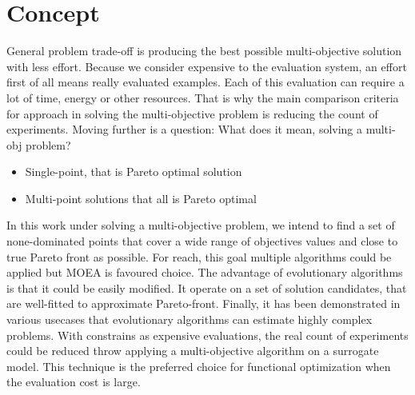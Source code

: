 \chapter{Concept}

    General problem trade-off is producing the best possible multi-objective solution with less effort. Because we consider expensive to the evaluation system, an effort first of all means really evaluated examples. Each of this evaluation can require a lot of time, energy or other resources. That is why the main comparison criteria for approach in solving the multi-objective problem is reducing the count of experiments. Moving further is a question: What does it mean, solving a multi-obj problem?
    \begin{itemize}
        \item Single-point, that is Pareto optimal solution
        \item Multi-point solutions that all is Pareto optimal
    \end{itemize}

    In this work under solving a multi-objective problem, we intend to find a set of none-dominated points that cover a wide range of objectives values and close to true Pareto front as possible. For reach, this goal multiple algorithms could be applied but MOEA is favoured choice. The advantage of evolutionary algorithms is that it could be easily modified. It operate on a set of solution candidates, that are well-fitted to approximate Pareto-front. Finally, it has been demonstrated in various usecases that evolutionary algorithms can estimate highly complex problems. With constrains as expensive evaluations, the real count of experiments could be reduced throw applying a multi-objective algorithm on a surrogate model. This technique is the preferred choice for functional optimization when the evaluation cost is large.

